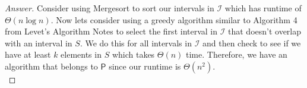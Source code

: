 \documentclass[11pt]{article}
\theoremstyle{definition}
\theoremstyle{definition}
\theoremstyle{definition}
\begin{document}
\begin{proof}[Answer]
	Consider using Mergesort to sort our intervals in $\mathcal{I}$ which has runtime of $\Theta(n \log n)$. Now lets consider using a greedy algorithm similar to Algorithm 4 from Levet's Algorithm Notes to select the first interval in $\mathcal{I}$ that doesn't overlap with an interval in $S$. We do this for all intervals in $\mathcal{I}$ and then check to see if we have at least $k$ elements in $S$ which takes $\Theta(n)$ time. Therefore, we have an algorithm that belongs to $\textsf{P}$ since our runtime is $\Theta(n^2)$.\\
	
\end{proof}
\end{document}
